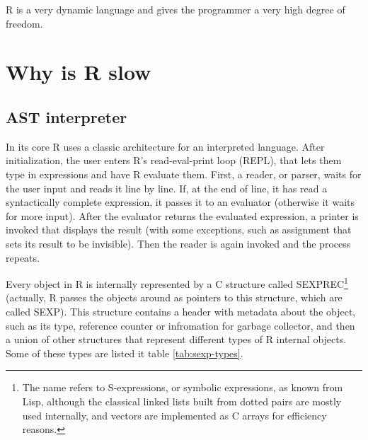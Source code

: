 R is a very dynamic language and gives the programmer a very high degree of freedom. 




\section{Why is R slow}




\subsection{AST interpreter}

In its core R uses a classic architecture for an interpreted language. After initialization, the user enters R's read-eval-print loop (REPL), that lets them type in expressions and have R evaluate them. First, a reader, or parser, waits for the user input and reads it line by line. If, at the end of line, it has read a syntactically complete expression, it passes it to an evaluator (otherwise it waits for more input). After the evaluator returns the evaluated expression, a printer is invoked that displays the result (with some exceptions, such as assignment that sets its result to be invisible). Then the reader is again invoked and the process repeats.

Every object in R is internally represented by a C structure called SEXPREC\footnote{The name refers to S-expressions, or symbolic expressions, as known from Lisp, although the classical linked lists built from dotted pairs are mostly used internally, and vectors are implemented as C arrays for efficiency reasons.} (actually, R passes the objects around as pointers to this structure, which are called SEXP). This structure contains a header with metadata about the object, such as its type, reference counter or infromation for garbage collector, and then a union of other structures that represent different types of R internal objects. Some of these types are listed it table \ref{tab:sexp-types}.

